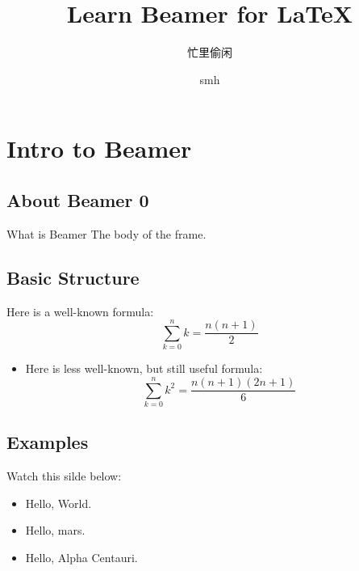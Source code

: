 \documentclass[pdf]{beamer}
\title{Learn Beamer for \LaTeX}
\subtitle{忙里偷闲}
\author{smh}
\begin{document}
\frame[plain]{\titlepage}   %



\section{Intro to Beamer}

\subsection{About Beamer 0}
\begin{frame}{What is Beamer}
The body of the frame.
\end{frame}

\subsection{Basic Structure}
\begin{frame}
Here is a well-known formula:
\begin{displaymath}
\sum_{k=0}^{n}k = \frac{n(n+1)}{2}
\end{displaymath}
\pause
\begin{itemize}
\item Here is less well-known, but still useful formula:
\begin{displaymath}
\sum_{k=0}^{n}k^2 = \frac{n(n+1)(2n+1)}{6}
\end{displaymath}
\end{itemize}
\end{frame}

\subsection{Examples}
\begin{frame}
Watch this silde below:
\begin{itemize}
\item<2->Hello, World.
\item<3->Hello, mars.
\item<4->Hello, Alpha Centauri.
\end{itemize}
\end{frame}
\end{document}
